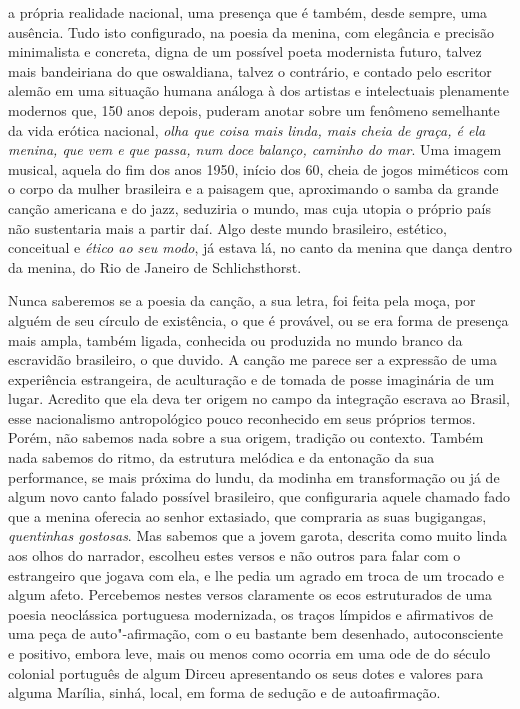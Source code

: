 a própria realidade nacional, uma presença que é também, desde sempre,
uma ausência. Tudo isto configurado, na poesia da menina, com elegância
e precisão minimalista e concreta, digna de um possível poeta modernista
futuro, talvez mais bandeiriana do que oswaldiana, talvez o contrário, e
contado pelo escritor alemão em uma situação humana análoga à dos
artistas e intelectuais plenamente modernos que, 150 anos depois,
puderam anotar sobre um fenômeno semelhante da vida erótica nacional,
\emph{olha que coisa mais linda, mais cheia de graça, é ela menina, que
vem e que passa, num doce balanço, caminho do mar}. Uma imagem musical,
aquela do fim dos anos 1950, início dos 60, cheia de jogos miméticos com
o corpo da mulher brasileira e a paisagem que, aproximando o samba da
grande canção americana e do jazz, seduziria o mundo, mas cuja utopia o
próprio país não sustentaria mais a partir daí. Algo deste mundo
brasileiro, estético, conceitual e \emph{ético ao seu modo}, já estava
lá, no canto da menina que dança dentro da menina, do Rio de Janeiro de
Schlichsthorst.

Nunca saberemos se a poesia da canção, a sua letra, foi feita pela moça,
por alguém de seu círculo de existência, o que é provável, ou se era
forma de presença mais ampla, também ligada, conhecida ou produzida no
mundo branco da escravidão brasileiro, o que duvido. A canção me parece
ser a expressão de uma experiência estrangeira, de aculturação e de
tomada de posse imaginária de um lugar. Acredito que ela deva ter origem
no campo da integração escrava ao Brasil, esse nacionalismo
antropológico pouco reconhecido em seus próprios termos. Porém, não
sabemos nada sobre a sua origem, tradição ou contexto. Também nada
sabemos do ritmo, da estrutura melódica e da entonação da sua
performance, se mais próxima do lundu, da modinha em transformação ou já
de algum novo canto falado possível brasileiro, que configuraria aquele
chamado fado que a menina oferecia ao senhor extasiado, que compraria as
suas bugigangas, \emph{quentinhas gostosas}. Mas sabemos que a jovem
garota, descrita como muito linda aos olhos do narrador, escolheu estes
versos e não outros para falar com o estrangeiro que jogava com ela, e
lhe pedia um agrado em troca de um trocado e algum afeto. Percebemos
nestes versos claramente os ecos estruturados de uma poesia neoclássica
portuguesa modernizada, os traços límpidos e afirmativos de uma peça de
auto"-afirmação, com o eu bastante bem desenhado, autoconsciente e
positivo, embora leve, mais ou menos como ocorria em uma ode de do
século  colonial português de algum Dirceu apresentando os seus
dotes e valores para alguma Marília, sinhá, local, em forma de sedução e
de autoafirmação.

